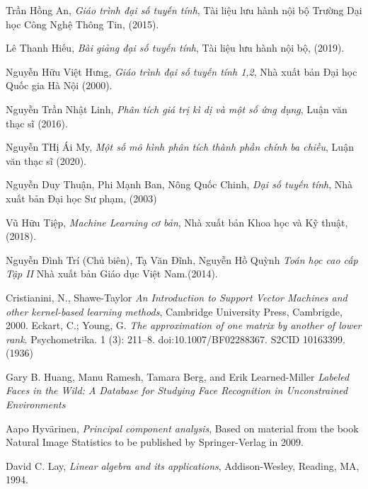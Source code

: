 \documentclass[12pt,a4paper,oneside]{report}
\numberwithin{equation}{section}
\begin{document}
\begin{thebibliography}{99}
Trần Hồng An,
\emph{Giáo trình đại số tuyến tính},
Tài liệu lưu hành nội bộ Trường Dại học Công Nghệ Thông Tin, (2015).

Lê Thanh Hiếu,
\emph{Bài giảng đại số tuyến tính},
Tài liệu lưu hành nội bộ, (2019).

Nguyễn Hữu Việt Hưng,
\emph{Giáo trình đại số tuyến tính 1,2},
Nhà xuất bản Đại học Quốc gia Hà Nội (2000).

Nguyễn Trần Nhật Linh,
\emph{Phân tích giá trị kì dị và một số ứng dụng},
Luận văn thạc sĩ (2016).

Nguyễn THị Ái My,
\emph{Một số mô hình phân tích thành phần chính ba chiều},
Luận văn thạc sĩ (2020).

Nguyễn Duy Thuận, Phi Mạnh Ban, Nông Quốc Chinh,
\emph{Dại số tuyến tính},
Nhà xuất bản Đại học Sư phạm, (2003)

Vũ Hữu Tiệp,
\emph{Machine Learning cơ bản},
Nhà xuất bản Khoa học và Kỹ thuật, (2018).

Nguyễn Đình Trí (Chủ biên), Tạ Văn Đĩnh, Nguyễn Hồ Quỳnh
\emph{Toán học cao cấp Tập II}
 Nhà xuất bản Giáo dục Việt Nam.(2014).

Cristianini, N., Shawe-Taylor
\emph{An Introduction to Support Vector Machines and other kernel-based learning methods},
Cambridge University Press, Cambrigde, 2000.
Eckart, C.; Young, G.
\emph{ The approximation of one matrix by another of lower rank}. Psychometrika. 1 (3): 211–8. doi:10.1007/BF02288367. S2CID 10163399.(1936)

Gary B. Huang, Manu Ramesh, Tamara Berg, and Erik Learned-Miller
\emph{Labeled Faces in the Wild: A Database for Studying
Face Recognition in Unconstrained Environments}

Aapo Hyvärinen,
\emph{Principal component analysis},
Based on material from the book Natural Image Statistics to be published by Springer-Verlag in 2009.



David C. Lay,
\emph{Linear algebra and its applications},
Addison-Wesley, Reading, MA, 1994.




\end{thebibliography}
\end{document}
